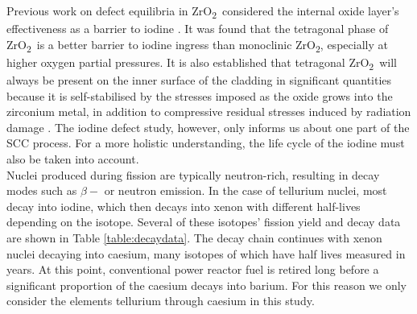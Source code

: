 \documentclass[11pt,a4paper]{article}
\newcommand{\zirconia}{ZrO\textsubscript{2}}
\begin{document}
Previous work on defect equilibria in \zirconia\ considered the internal oxide layer's effectiveness as a barrier to iodine \cite{kenichiodine2018}. It was found that the tetragonal phase of \zirconia\ is a better barrier to iodine ingress than monoclinic \zirconia , especially at higher oxygen partial pressures. It is also established that tetragonal \zirconia\ will always be present on the inner surface of the cladding in significant quantities because it is self-stabilised by the stresses imposed as the oxide grows into the zirconium metal, in addition to compressive residual stresses induced by radiation damage \cite{causey2005review}. The iodine defect study, however, only informs us about one part of the SCC process. For a more holistic understanding, the life cycle of the iodine must also be taken into account.     \\




Nuclei produced during fission are typically neutron-rich, resulting in decay modes such as $\beta-$ or neutron emission. In the case of tellurium nuclei, most decay into iodine, which then decays into xenon with different half-lives depending on the isotope. Several of these isotopes' fission yield and decay data are shown in Table \ref{table:decaydata}. The decay chain continues with xenon nuclei decaying into caesium, many isotopes of which have half lives measured in years. At this point, conventional power reactor fuel is retired long before a significant proportion of the caesium decays into barium. For this reason we only consider the elements tellurium through caesium in this study. \\
\end{document}
